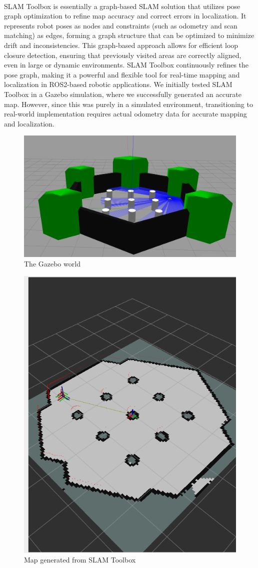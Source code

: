\paragraph*{}
SLAM Toolbox is essentially a graph-based SLAM solution that utilizes pose graph optimization to refine map accuracy and correct errors in localization. It represents robot poses as nodes and constraints (such as odometry and scan matching) as edges, forming a graph structure that can be optimized to minimize drift and inconsistencies. This graph-based approach allows for efficient loop closure detection, ensuring that previously visited areas are correctly aligned, even in large or dynamic environments. SLAM Toolbox continuously refines the pose graph, making it a powerful and flexible tool for real-time mapping and localization in ROS2-based robotic applications. We initially tested SLAM Toolbox in a Gazebo simulation, where we successfully generated an accurate map. However, since this was purely in a simulated environment, transitioning to real-world implementation requires actual odometry data for accurate mapping and localization.

\begin{figure} [H]
    \centering
    \includegraphics[width=0.5\linewidth]{assets/images/slam/gazebo_test_world.png}
    \caption{The Gazebo world}
    \label{fig:gazebo_map}
\end{figure}

\begin{figure} [H]
    \centering
    \includegraphics[width=0.5\linewidth]{assets/images/slam/slam_toolbox.png}
    \caption{Map generated from SLAM Toolbox}
    \label{fig:graph_slam_map}
\end{figure}

